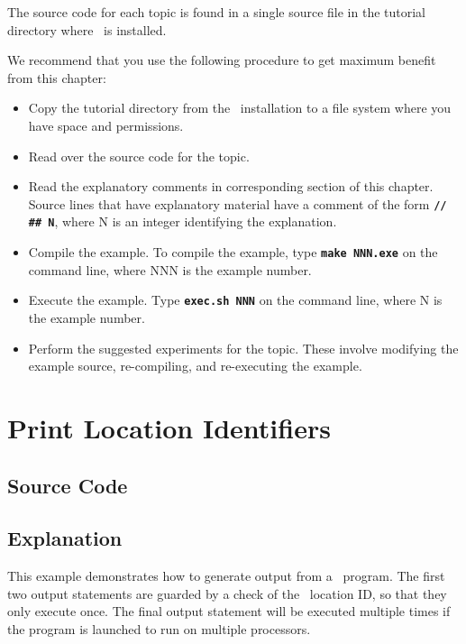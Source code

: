 \documentclass{report}
\begin{document}
The source code for each topic is found in a single source file in
the tutorial directory where \stapl\ is installed.

We recommend that you use the following procedure to get maximum benefit
from this chapter:

\begin{itemize}
\item
Copy the tutorial directory from the \stapl\ installation to a file system
where you have space and permissions.
\item
Read over the source code for the topic.
\item
Read the explanatory comments in corresponding section of this chapter.
Source lines that have explanatory material have a comment of the form
\texttt{{\bf // \#\# N}},
where N is an integer identifying the explanation.
\item
Compile the example.  To compile the example,
type
\texttt{{\bf make NNN.exe}}
on the command line, where NNN is the example number.
\item
Execute the example.  Type
\texttt{{\bf exec.sh NNN}}
on the command line,
where N is the example number.
\item
Perform the suggested experiments for the topic.  These involve modifying
the example source, re-compiling, and re-executing the example.
\end{itemize}


\pagebreak
\section{Print Location Identifiers}

\subsection{Source Code}




\subsection{Explanation}

This example demonstrates how to generate output from a \stapl\ program.
The first two output statements are guarded by a check of the \stapl\
location ID, so that they only execute once.
The final output statement will be executed multiple times if the
program is launched to run on multiple processors.
\end{document}
